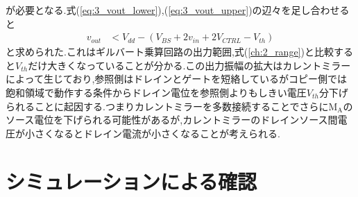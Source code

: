         が必要となる.式(\ref{eq:3_vout_lower}),(\ref{eq:3_vout_upper})の辺々を足し合わせると
        \begin{align}
            v_{out}&<V_{dd}-(V_{BS}+2v_{in}+2V_{CTRL}-V_{th})                  \label{eq:3_vout_range}
        \end{align}
        と求められた.これはギルバート乗算回路の出力範囲,式(\ref{ch:2_range})と比較すると$V_{th}$だけ大きくなっていることが分かる.この出力振幅の拡大はカレントミラーによって生じており,参照側はドレインとゲートを短絡しているがコピー側では飽和領域で動作する条件からドレイン電位を参照側よりもしきい電圧$V_{th}$分下げられることに起因する.つまりカレントミラーを多数接続することでさらに$\mathrm{M_{A}}$のソース電位を下げられる可能性があるが,カレントミラーのドレインソース間電圧が小さくなるとドレイン電流が小さくなることが考えられる.


    \section{シミュレーションによる確認}
        
